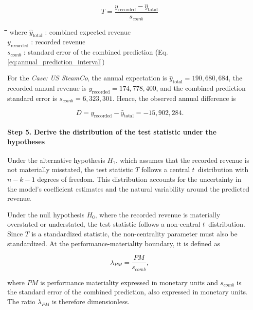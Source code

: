 \begin{equation}
\label{eq:test_statistic}
  T = \frac{y_{\text{recorded}} - \hat{y}_{\text{total}}}{s_{comb}}
\end{equation}

\begin{tabbing}
\hspace*{1.2cm}\=\hspace*{1.4cm}\=\hspace*{0.2cm}\= \kill
where \> $\hat{y}_{\text{total}}$ \> : \> combined expected revenue \\
      \> $y_{\text{recorded}}$     \> : \> recorded revenue \\
      \> $s_{comb}$     \> : \> standard error of the combined prediction (Eq. \ref{eq:annual_prediction_interval})
\end{tabbing}

For the \emph{Case: US SteamCo}, the annual expectation is $\hat{y}_{\text{total}} = 190,680,684$, the recorded annual revenue is $y_{\text{recorded}} = 174,778,400$, and the combined prediction standard error is $s_{comb} = 6,323,301$. Hence, the observed annual difference is

\[
D = y_{\text{recorded}} - \hat{y}_{\text{total}} = -15,902,284.
\]

\paragraph{Step 5. Derive the distribution of the test statistic under the hypotheses}
Under the alternative hypothesis $H_1$, which assumes that the recorded revenue is not materially misstated, the test statistic $T$ follows a central $t$~distribution with $n-k-1$ degrees of freedom. This distribution accounts for the uncertainty in the model's coefficient estimates and the natural variability around the predicted revenue.

Under the null hypothesis $H_0$, where the recorded revenue is materially overstated or understated, the test statistic follows a non-central $t$~distribution. Since $T$ is a standardized statistic, the non-centrality parameter must also be standardized. At the performance-materiality boundary, it is defined as

\begin{equation}
\label{eq:standardized_noncentrality_parameter}
  \lambda_{PM} = \frac{PM}{s_{comb}} ,
\end{equation}

where $PM$ is performance materiality expressed in monetary units and $s_{comb}$ is the standard error of the combined prediction, also expressed in monetary units. The ratio $\lambda_{PM}$ is therefore dimensionless.


